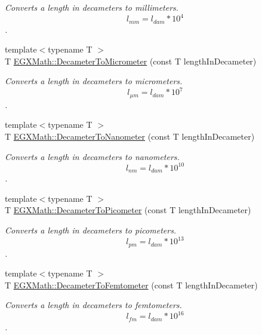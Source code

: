 \begin{DoxyCompactItemize}
\begin{DoxyCompactList}\small\item\em Converts a length in decameters to millimeters. \[ l_{mm}=l_{dam} * 10^{4} \]. \end{DoxyCompactList}\item 
{\footnotesize template$<$typename T $>$ }\\T \mbox{\hyperlink{group___e_g_x_math-_conversions-_length_conversions-_decameter-_s_i_gaa5b6d3a32a921345aa1ccb66a8df07c1}{E\+G\+X\+Math\+::\+Decameter\+To\+Micrometer}} (const T length\+In\+Decameter)
\begin{DoxyCompactList}\small\item\em Converts a length in decameters to micrometers. \[ l_{\mu m}=l_{dam} * 10^{7} \]. \end{DoxyCompactList}\item 
{\footnotesize template$<$typename T $>$ }\\T \mbox{\hyperlink{group___e_g_x_math-_conversions-_length_conversions-_decameter-_s_i_gad2173f361037d8cfbdcc6b99c79a9105}{E\+G\+X\+Math\+::\+Decameter\+To\+Nanometer}} (const T length\+In\+Decameter)
\begin{DoxyCompactList}\small\item\em Converts a length in decameters to nanometers. \[ l_{nm}=l_{dam} * 10^{10} \]. \end{DoxyCompactList}\item 
{\footnotesize template$<$typename T $>$ }\\T \mbox{\hyperlink{group___e_g_x_math-_conversions-_length_conversions-_decameter-_s_i_gab265bbced03f7b08cf4ad0db29da6dfd}{E\+G\+X\+Math\+::\+Decameter\+To\+Picometer}} (const T length\+In\+Decameter)
\begin{DoxyCompactList}\small\item\em Converts a length in decameters to picometers. \[ l_{pm}=l_{dam} * 10^{13} \]. \end{DoxyCompactList}\item 
{\footnotesize template$<$typename T $>$ }\\T \mbox{\hyperlink{group___e_g_x_math-_conversions-_length_conversions-_decameter-_s_i_gae42b64853340c10623d206afbc6a9ff4}{E\+G\+X\+Math\+::\+Decameter\+To\+Femtometer}} (const T length\+In\+Decameter)
\begin{DoxyCompactList}\small\item\em Converts a length in decameters to femtometers. \[ l_{fm}=l_{dam} * 10^{16} \]. \end{DoxyCompactList}\item 

\end{DoxyCompactItemize}
